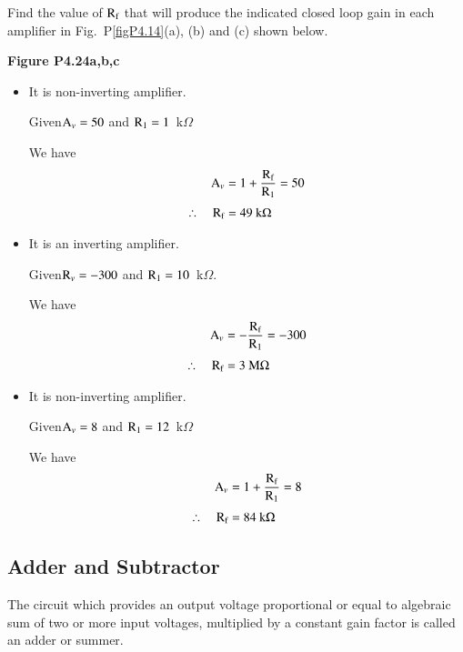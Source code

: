 \begin{problem}\label{prob4.24}
Find the value of $\textrm{R}_{\textrm{f}}$ that will produce the indicated closed loop gain in each amplifier in Fig.~P\ref{figP4.14}(a), (b) and (c) shown below.
\begin{center}
{\bf Figure P4.24a,b,c}
\end{center}
\end{problem}

\begin{solution}
\begin{itemize}
\item[(a)] It is non-inverting amplifier.

Given\quad $\textrm{A}_{v}=50$ and $\textrm{R}_{1}=1$~k$\Omega$

We have
\begin{align*}
\textrm{A}_{v} &= 1+\frac{\textrm{R}_{\textrm{f}}}{\textrm{R}_{1}}=50\\[3pt]
\therefore\quad \textrm{R}_{\textrm{f}} &= 49\text{~k}\Omega
\end{align*}

\item[(b)] It is an inverting amplifier.

Given\quad $\textrm{R}_{v}=-300$ and $\textrm{R}_{1}=10$~k$\Omega$.

We have
\begin{align*}
\textrm{A}_{v} &= -\frac{\textrm{R}_{\textrm{f}}}{\textrm{R}_{1}}=-300\\[3pt]
\therefore\quad \textrm{R}_{\textrm{f}} &= 3\text{~M}\Omega
\end{align*}

\item[(c)] It is non-inverting amplifier.

Given\quad $\textrm{A}_{v}=8$ and $\textrm{R}_{1}=12$~k$\Omega$

We have
\begin{align*}
\textrm{A}_{v} &= 1+\frac{\textrm{R}_{\textrm{f}}}{\textrm{R}_{1}}=8\\[3pt]
\therefore\quad \textrm{R}_{\textrm{f}} &= 84\text{~k}\Omega
\end{align*}
\end{itemize}
\end{solution}

\subsection{Adder and Subtractor}

The circuit which provides an output voltage proportional or equal to algebraic sum of two or more input voltages, multiplied by a constant gain factor is called an adder or summer.

